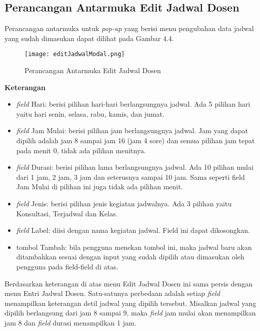 \subsection{Perancangan Antarmuka Edit Jadwal Dosen}
Perancangan antarmuka untuk \textit{pop-up} yang berisi menu pengubahan data jadwal yang sudah dimasukan dapat dilihat pada Gambar 4.4.
\begin{figure} [H]
	\centering  
	\texttt{[image: editJadwalModal.png]}
	\caption[Perancangan Antarmuka Edit Jadwal Dosen]{Perancangan Antarmuka Edit Jadwal Dosen} 
	\label{fig:flow-chart-CodeIgniter} 
\end{figure}
\textbf{Keterangan}
\begin{itemize}
		\item \textit{field} Hari: berisi pilihan hari-hari berlangsungnya jadwal. Ada 5 pilihan hari yaitu hari senin, selasa, rabu, kamis, dan jumat.
		\item \textit{field} Jam Mulai: berisi pilihan jam berlangsungnya jadwal. Jam yang dapat dipilih adalah jam 8 sampai jam 16 (jam 4 sore) dan semua 		pilihan jam tepat pada menit 0, tidak ada pilihan menitnya.
		\item \textit{field} Durasi: berisi pilihan lama berlangsungnya jadwal. Ada 10 pilihan mulai dari 1 jam, 2 jam, 3 jam dan seterusnya sampai 10 			jam. Sama seperti field Jam Mulai di pilihan ini juga tidak ada pilihan menit.
		\item \textit{field} Jenis: berisi pilihan jenis kegiatan jadwalnya. Ada 3 pilihan yaitu Konsultasi, Terjadwal dan Kelas.
		\item \textit{field} Label: diisi dengan nama kegiatan jadwal. Field ini dapat dikosongkan.
		\item tombol Tambah: bila pengguna menekan tombol ini, maka jadwal baru akan ditambahkan sesuai dengan input yang sudah dipilih atau dimasukan oleh pengguna pada field-field di atas.
	\end{itemize}
Berdasarkan keterangan di atas menu Edit Jadwal Dosen ini sama persis dengan menu Entri Jadwal Dosen. Satu-satunya perbedaan adalah setiap \textit{field} menampilkan keterangan detil jadwal yang dipilih tersebut. Misalkan jadwal yang dipilih berlangsung dari jam 8 sampai 9, maka \textit{field} jam mulai akan menampilkan jam 8 dan \textit{field} durasi menampilkan 1 jam.

